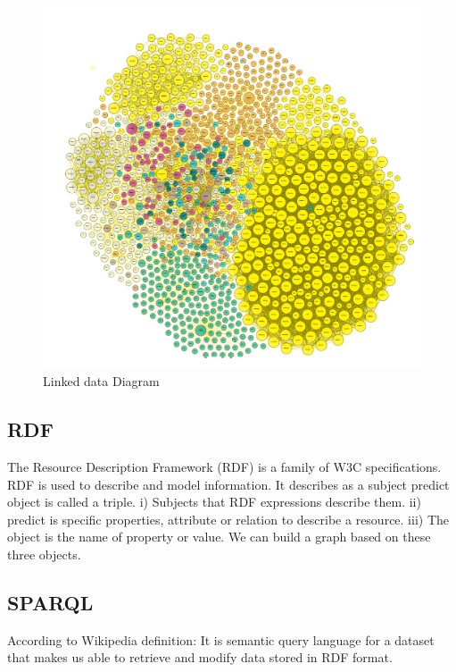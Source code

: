 \begin{center}
	\begin{figure}[htb!]
		
		\begin{minipage}{0.55\linewidth}
			\centering
			\includegraphics[width=1.55\textwidth]{images/chap02_LinkData.png}
		\end{minipage}
		\caption[Linked data diagram]{Linked data Diagram\cite{Hector}}
		
		
	\end{figure}
	
\end{center}
\subsection{RDF}
The Resource Description Framework (RDF) is a family
of W3C specifications. RDF is used to describe and model information. It describes as a subject predict object is called a triple.
i) Subjects that RDF expressions describe them.
ii) predict is specific properties, attribute or relation to describe a resource.
iii) The object is the name of property or value.
We can build a graph based on these three objects.

\subsection{SPARQL}
According to Wikipedia definition: It is semantic query language for a dataset that makes us able to retrieve and modify data stored in RDF format.    

